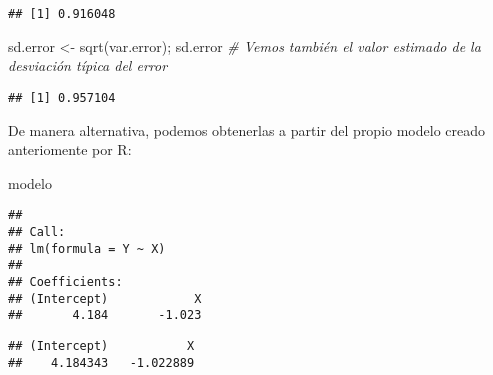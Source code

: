 \documentclass[
]{article}
\newenvironment{Shaded}{\begin{snugshade}}{\end{snugshade}}
\newcommand{\CommentTok}[1]{\textcolor[rgb]{0.56,0.35,0.01}{\textit{#1}}}
\newcommand{\DecValTok}[1]{\textcolor[rgb]{0.00,0.00,0.81}{#1}}
\newcommand{\FunctionTok}[1]{\textcolor[rgb]{0.00,0.00,0.00}{#1}}
\newcommand{\NormalTok}[1]{#1}
\newcommand{\OtherTok}[1]{\textcolor[rgb]{0.56,0.35,0.01}{#1}}
\newcommand{\SpecialCharTok}[1]{\textcolor[rgb]{0.00,0.00,0.00}{#1}}
\begin{document}
\begin{verbatim}
## [1] 0.916048
\end{verbatim}

\begin{Shaded}
\begin{Highlighting}[]
\NormalTok{sd.error }\OtherTok{\textless{}{-}} \FunctionTok{sqrt}\NormalTok{(var.error); sd.error      }\CommentTok{\# Vemos también el valor estimado de la desviación típica del error}
\end{Highlighting}
\end{Shaded}

\begin{verbatim}
## [1] 0.957104
\end{verbatim}

De manera alternativa, podemos obtenerlas a partir del propio modelo
creado anteriomente por R:

\begin{Shaded}
\begin{Highlighting}[]
\NormalTok{modelo}
\end{Highlighting}
\end{Shaded}

\begin{verbatim}
## 
## Call:
## lm(formula = Y ~ X)
## 
## Coefficients:
## (Intercept)            X  
##       4.184       -1.023
\end{verbatim}

\begin{Shaded}
\end{Shaded}

\begin{verbatim}
## (Intercept)           X 
##    4.184343   -1.022889
\end{verbatim}

\begin{Shaded}
\end{Shaded}
\end{document}
